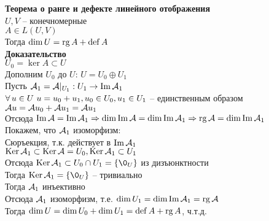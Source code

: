 \documentclass[12pt]{article}
\begin{document}
\textbf{Теорема о ранге и дефекте линейного отображения}\\
$U, V$ -- конечномерные\\
$A \in L(U, V)$\\
Тогда $\dim U = \operatorname{rg} A + \operatorname{def} A$\\
\textbf{Доказательство}\\
$U_0 = \ker A \subset U$\\
Дополним $U_0$ до $U$:
$U = U_0 \oplus U_1$\\
Пусть $\mathcal{A}_1 = \mathcal{A}|_{U_1}: U_1 \rightarrow \operatorname{Im} \mathcal{A}_1$\\
$\forall\, u \in U\ u=u_0 + u_1, u_0 \in U_0, u_1 \in U_1$ -- единственным образом\\ 
$\mathcal{A} u = \mathcal{A} u_0 + \mathcal{A} u_1 = \mathcal{A} u_1$\\
Отсюда $\operatorname{Im} \mathcal{A} = \operatorname{Im} \mathcal{A}_1 \Rightarrow \dim \operatorname{Im} \mathcal{A} = \dim \operatorname{Im} \mathcal{A}_1 \Rightarrow \operatorname{rg} \mathcal{A} = \dim \operatorname{Im} \mathcal{A}_1$\\
Покажем, что $\mathcal{A}_1$ изоморфизм:\\
Сюръекция, т.к. действует в $\operatorname{Im} \mathcal{A}_1$\\
$\operatorname{Ker} \mathcal{A}_1 \subset \operatorname{Ker} \mathcal{A} = U_0, \operatorname{Ker} \mathcal{A}_1 \subset U_1$\\
Отсюда $\ker \mcA_1 \subset U_0 \cap U_1 = \{ \0_U\}$ из дизъюнктности\\
Тогда $\ker \mcA_1 = \{ \0_U \}$ -- тривиально\\
Тогда $\mathcal{A}_1$ инъективно\\
Отсюда $\mathcal{A}_1$ изоморфизм, т.е. $\dim U_1 = \dim \operatorname{Im} \mathcal{A}_1 = \operatorname{rg} \mathcal{A}$\\
Тогда $\dim U = \dim U_0 + \dim U_1 = \operatorname{def} A + \operatorname{rg} A$, ч.т.д.
\end{document}
